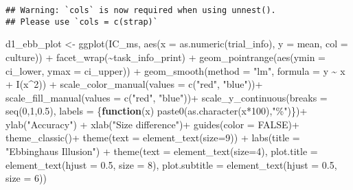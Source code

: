 \documentclass[
]{article}
\newenvironment{Shaded}{\begin{snugshade}}{\end{snugshade}}
\newcommand{\AttributeTok}[1]{\textcolor[rgb]{0.77,0.63,0.00}{#1}}
\newcommand{\ConstantTok}[1]{\textcolor[rgb]{0.00,0.00,0.00}{#1}}
\newcommand{\ControlFlowTok}[1]{\textcolor[rgb]{0.13,0.29,0.53}{\textbf{#1}}}
\newcommand{\DecValTok}[1]{\textcolor[rgb]{0.00,0.00,0.81}{#1}}
\newcommand{\FloatTok}[1]{\textcolor[rgb]{0.00,0.00,0.81}{#1}}
\newcommand{\FunctionTok}[1]{\textcolor[rgb]{0.00,0.00,0.00}{#1}}
\newcommand{\NormalTok}[1]{#1}
\newcommand{\OtherTok}[1]{\textcolor[rgb]{0.56,0.35,0.01}{#1}}
\newcommand{\SpecialCharTok}[1]{\textcolor[rgb]{0.00,0.00,0.00}{#1}}
\newcommand{\StringTok}[1]{\textcolor[rgb]{0.31,0.60,0.02}{#1}}
\begin{document}
\begin{verbatim}
## Warning: `cols` is now required when using unnest().
## Please use `cols = c(strap)`
\end{verbatim}

\begin{Shaded}
\begin{Highlighting}[]
\NormalTok{d1\_ebb\_plot }\OtherTok{\textless{}{-}} \FunctionTok{ggplot}\NormalTok{(IC\_ms, }\FunctionTok{aes}\NormalTok{(}\AttributeTok{x =} \FunctionTok{as.numeric}\NormalTok{(trial\_info), }\AttributeTok{y =}\NormalTok{ mean, }\AttributeTok{col =}\NormalTok{ culture)) }\SpecialCharTok{+} 
  \FunctionTok{facet\_wrap}\NormalTok{(}\SpecialCharTok{\textasciitilde{}}\NormalTok{task\_info\_print) }\SpecialCharTok{+} 
  \FunctionTok{geom\_pointrange}\NormalTok{(}\FunctionTok{aes}\NormalTok{(}\AttributeTok{ymin =}\NormalTok{ ci\_lower, }\AttributeTok{ymax =}\NormalTok{ ci\_upper)) }\SpecialCharTok{+} 
  \FunctionTok{geom\_smooth}\NormalTok{(}\AttributeTok{method =} \StringTok{"lm"}\NormalTok{, }\AttributeTok{formula =}\NormalTok{ y }\SpecialCharTok{\textasciitilde{}}\NormalTok{ x }\SpecialCharTok{+} \FunctionTok{I}\NormalTok{(x}\SpecialCharTok{\^{}}\DecValTok{2}\NormalTok{)) }\SpecialCharTok{+} 
  \FunctionTok{scale\_color\_manual}\NormalTok{(}\AttributeTok{values =} \FunctionTok{c}\NormalTok{(}\StringTok{"red"}\NormalTok{, }\StringTok{"blue"}\NormalTok{))}\SpecialCharTok{+}
\FunctionTok{scale\_fill\_manual}\NormalTok{(}\AttributeTok{values =} \FunctionTok{c}\NormalTok{(}\StringTok{"red"}\NormalTok{, }\StringTok{"blue"}\NormalTok{))}\SpecialCharTok{+}
  \FunctionTok{scale\_y\_continuous}\NormalTok{(}\AttributeTok{breaks =} \FunctionTok{seq}\NormalTok{(}\DecValTok{0}\NormalTok{,}\DecValTok{1}\NormalTok{,}\FloatTok{0.5}\NormalTok{), }
                     \AttributeTok{labels =}\NormalTok{ \{}\ControlFlowTok{function}\NormalTok{(x) }\FunctionTok{paste0}\NormalTok{(}\FunctionTok{as.character}\NormalTok{(x}\SpecialCharTok{*}\DecValTok{100}\NormalTok{),}\StringTok{"\%"}\NormalTok{)\})}\SpecialCharTok{+}
  \FunctionTok{ylab}\NormalTok{(}\StringTok{"Accuracy"}\NormalTok{) }\SpecialCharTok{+} 
\FunctionTok{xlab}\NormalTok{(}\StringTok{"Size difference"}\NormalTok{)}\SpecialCharTok{+}
  \FunctionTok{guides}\NormalTok{(}\AttributeTok{color =} \ConstantTok{FALSE}\NormalTok{)}\SpecialCharTok{+}
\FunctionTok{theme\_classic}\NormalTok{()}\SpecialCharTok{+}
  \FunctionTok{theme}\NormalTok{(}\AttributeTok{text =} \FunctionTok{element\_text}\NormalTok{(}\AttributeTok{size=}\DecValTok{9}\NormalTok{)) }\SpecialCharTok{+} 
   \FunctionTok{labs}\NormalTok{(}\AttributeTok{title =} \StringTok{"Ebbinghaus Illusion"}\NormalTok{) }\SpecialCharTok{+}
\FunctionTok{theme}\NormalTok{(}\AttributeTok{text =} \FunctionTok{element\_text}\NormalTok{(}\AttributeTok{size=}\DecValTok{4}\NormalTok{),}
      \AttributeTok{plot.title =} \FunctionTok{element\_text}\NormalTok{(}\AttributeTok{hjust =} \FloatTok{0.5}\NormalTok{, }\AttributeTok{size =} \DecValTok{8}\NormalTok{), }
      \AttributeTok{plot.subtitle =} \FunctionTok{element\_text}\NormalTok{(}\AttributeTok{hjust =} \FloatTok{0.5}\NormalTok{, }\AttributeTok{size =} \DecValTok{6}\NormalTok{))  }
\end{Highlighting}
\end{Shaded}
\end{document}
